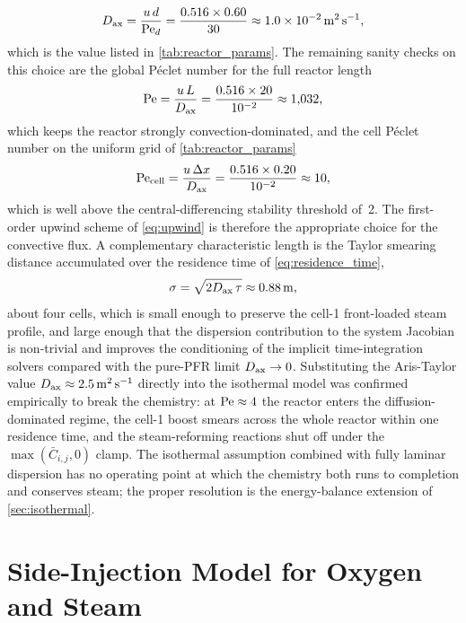 %
\begin{equation*}
  D_{\mathrm{ax}} = \frac{u\,d}{\mathrm{Pe}_d}
       = \frac{0.516 \times 0.60}{30}
       \approx \SI{1.0e-2}{\metre\squared\per\second},
\end{equation*}
%
which is the value listed in \cref{tab:reactor_params}. The remaining sanity checks on this choice are the global P\'eclet number for the full reactor length
%
\begin{equation}
  \mathrm{Pe} = \frac{u\,L}{D_{\mathrm{ax}}}
      = \frac{0.516 \times 20}{10^{-2}}
      \approx 1{,}032,
  \label{eq:pe_reactor}
\end{equation}
%
which keeps the reactor strongly convection-dominated, and the cell P\'eclet number on the uniform grid of \cref{tab:reactor_params}
%
\begin{equation}
  \mathrm{Pe}_{\mathrm{cell}}
  = \frac{u\,\Delta x}{D_{\mathrm{ax}}}
  = \frac{0.516 \times 0.20}{10^{-2}}
  \approx 10,
  \label{eq:pe_cell}
\end{equation}
%
which is well above the central-differencing stability threshold of~2. The first-order upwind scheme of \cref{eq:upwind} is therefore the appropriate choice for the convective flux. A complementary characteristic length is the Taylor smearing distance accumulated over the residence time of \cref{eq:residence_time},
%
\begin{equation*}
  \sigma = \sqrt{2D_{\mathrm{ax}}\,\tau} \approx \SI{0.88}{\metre},
\end{equation*}
%
about four cells, which is small enough to preserve the cell-1 front-loaded steam profile, and large enough that the dispersion contribution to the system Jacobian is non-trivial and improves the conditioning of the implicit time-integration solvers compared with the pure-PFR limit \(D_{\mathrm{ax}} \to 0\). Substituting the Aris-Taylor value \(D_{\mathrm{ax}} \approx \SI{2.5}{\metre\squared\per\second}\) directly into the isothermal model was confirmed empirically to break the chemistry: at \(\mathrm{Pe} \approx 4\) the reactor enters the diffusion-dominated regime, the cell-1  boost smears across the whole reactor within one residence time, and the steam-reforming reactions shut off under the \(\max(\bar{C}_{i,j}, 0)\) clamp. The isothermal assumption combined with fully laminar dispersion has no operating point at which the chemistry both runs to completion and conserves steam; the proper resolution is the energy-balance extension of \cref{sec:isothermal}.

\section{Side-Injection Model for Oxygen and Steam}\label{sec:injectors}

